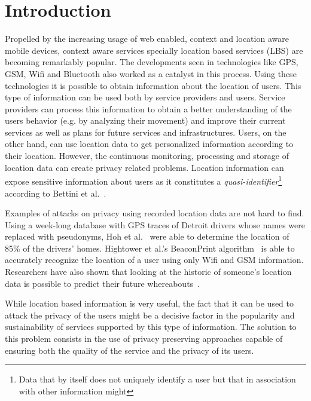 \chapter{Introduction}
\label{cha:introduction}

Propelled by the increasing usage of web enabled, context and location
aware mobile devices, context aware services specially location based
services (LBS) are becoming remarkably popular. The developments seen
in technologies like GPS, GSM, Wifi and Bluetooth also worked as a
catalyst in this process. Using these technologies it is possible to
obtain information about the location of users. This type of
information can be used both by service providers and users. Service
providers can process this information to obtain a better
understanding of the users behavior (e.g. by analyzing their movement)
and improve their current services as well as plans for future
services and infrastructures. Users, on the other hand, can use
location data to get personalized information according to their
location. However, the continuous monitoring, processing and storage
of location data can create privacy related problems. Location
information can expose sensitive information about users as it
constitutes a \emph{quasi-identifier}\footnote{Data that by itself
  does not uniquely identify a user but that in association with other
  information might} according to Bettini et
al.~\cite{bettini2005protecting}.

Examples of attacks on privacy using recorded location data are not
hard to find. Using a week-long database with GPS traces of Detroit
drivers whose names were replaced with pseudonyms, Hoh et
al.~\cite{hoh2006enhancing} were able to determine the location of
85\% of the drivers' homes. Hightower et al.'s BeaconPrint
algorithm~\cite{hightower2005learning} is able to accurately recognize
the location of a user using only Wifi and GSM
information. Researchers have also shown that looking at the historic
of someone's location data is possible to predict their future
whereabouts~\cite{krumm2006predestination,froehlich2008route}.

While location based information is very useful, the fact that it can
be used to attack the privacy of the users might be a decisive factor
in the popularity and sustainability of services supported by this
type of information.  The solution to this problem consists in the use
of privacy preserving approaches capable of ensuring both the quality
of the service and the privacy of its users.


